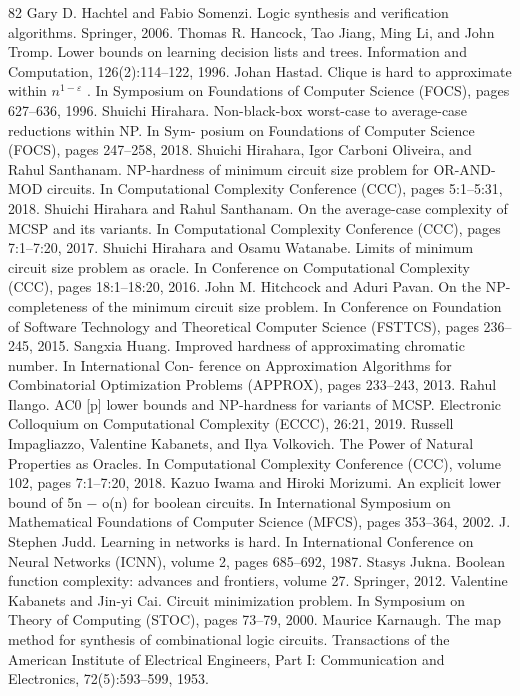 \begin{thebibliography}{82}
Gary D. Hachtel and Fabio Somenzi. Logic synthesis and verification algorithms. Springer, 2006.
Thomas R. Hancock, Tao Jiang, Ming Li, and John Tromp. Lower bounds on learning decision lists and trees. Information and Computation, 126(2):114–122, 1996.
Johan Hastad. Clique is hard to approximate within $n^{1-\varepsilon}$ . In Symposium on Foundations of Computer Science (FOCS), pages 627–636, 1996.
Shuichi Hirahara. Non-black-box worst-case to average-case reductions within NP. In Sym- posium on Foundations of Computer Science (FOCS), pages 247–258, 2018.
Shuichi Hirahara, Igor Carboni Oliveira, and Rahul Santhanam. NP-hardness of minimum circuit size problem for OR-AND-MOD circuits. In Computational Complexity Conference (CCC), pages 5:1–5:31, 2018.
Shuichi Hirahara and Rahul Santhanam. On the average-case complexity of MCSP and its variants. In Computational Complexity Conference (CCC), pages 7:1–7:20, 2017.
Shuichi Hirahara and Osamu Watanabe. Limits of minimum circuit size problem as oracle. In Conference on Computational Complexity (CCC), pages 18:1–18:20, 2016.
John M. Hitchcock and Aduri Pavan. On the NP-completeness of the minimum circuit size problem. In Conference on Foundation of Software Technology and Theoretical Computer Science (FSTTCS), pages 236–245, 2015.
Sangxia Huang. Improved hardness of approximating chromatic number. In International Con- ference on Approximation Algorithms for Combinatorial Optimization Problems (APPROX), pages 233–243, 2013.
Rahul Ilango. AC0 [p] lower bounds and NP-hardness for variants of MCSP. Electronic Colloquium on Computational Complexity (ECCC), 26:21, 2019.
Russell Impagliazzo, Valentine Kabanets, and Ilya Volkovich. The Power of Natural Properties as Oracles. In Computational Complexity Conference (CCC), volume 102, pages 7:1–7:20, 2018.
Kazuo Iwama and Hiroki Morizumi. An explicit lower bound of 5n − o(n) for boolean circuits. In International Symposium on Mathematical Foundations of Computer Science (MFCS), pages 353–364, 2002.
J. Stephen Judd. Learning in networks is hard. In International Conference on Neural Networks (ICNN), volume 2, pages 685–692, 1987.
Stasys Jukna. Boolean function complexity: advances and frontiers, volume 27. Springer, 2012.
Valentine Kabanets and Jin-yi Cai. Circuit minimization problem. In Symposium on Theory of Computing (STOC), pages 73–79, 2000.
Maurice Karnaugh. The map method for synthesis of combinational logic circuits. Transactions of the American Institute of Electrical Engineers, Part I: Communication and Electronics, 72(5):593–599, 1953.

\end{thebibliography}

